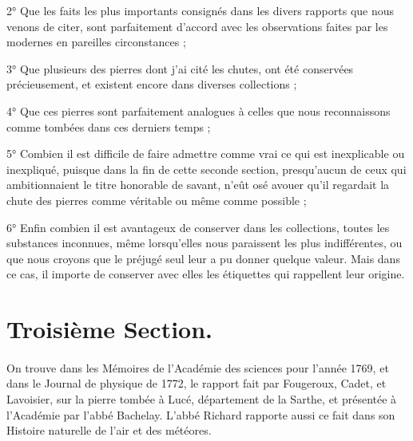 \documentclass[a4paper, 12pt, oneside, french]{article}
\begin{document}
2° Que les faits les plus importants consignés dans les divers rapports que nous venons de citer, sont parfaitement d'accord avec les observations faites par les modernes en pareilles circonstances ;

3° Que plusieurs des pierres dont j'ai cité les chutes, ont été conservées précieusement, et existent encore dans diverses collections ;

4° Que ces pierres sont parfaitement analogues à celles que nous reconnaissons comme tombées dans ces derniers temps ;

5° Combien il est difficile de faire admettre comme vrai ce qui est inexplicable ou inexpliqué, puisque dans la fin de cette seconde section, presqu'aucun de ceux qui ambitionnaient le titre honorable de savant, n'eût osé avouer qu'il regardait la chute des pierres comme véritable ou même comme possible ;

6° Enfin combien il est avantageux de conserver dans les collections, toutes les substances inconnues, même lorsqu'elles nous paraissent les plus indifférentes, ou que nous croyons que le préjugé seul leur a pu donner quelque valeur. Mais dans ce cas, il importe de conserver avec elles les étiquettes qui rappellent leur origine.
\clearpage
\section{Troisième Section.}
\paragraph{}
On trouve dans les Mémoires de l'Académie des sciences pour l'année 1769, et dans le Journal de physique de 1772, le rapport fait par Fougeroux, Cadet, et Lavoisier, sur la pierre tombée à Lucé, département de la Sarthe, et présentée à l'Académie par l'abbé Bachelay. L'abbé Richard rapporte aussi ce fait dans son Histoire naturelle de l'air et des météores.
\end{document}
